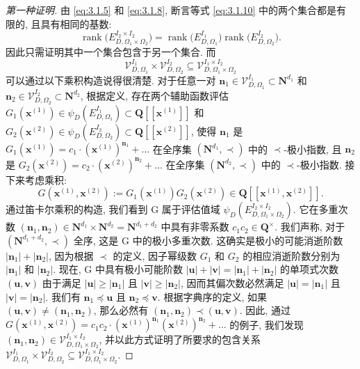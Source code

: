 \begin{proof}[第一种证明]
由 \eqref{eq:3.1.5} 和 \eqref{eq:3.1.8}, 断言等式 \eqref{eq:3.1.10} 中的两个集合都是有限的, 且具有相同的基数:
\[ \operatorname{rank} \big( E_{D,\Omega_1 \times \Omega_2}^{I_2 \times I_2} \big) = \operatorname{rank} \big( E_{D,\Omega_1}^{I_1} \big) \operatorname{rank} \big( E_{D,\Omega_2}^{I_2} \big). \]
因此只需证明其中一个集合包含于另一个集合. 而
\[ \mathcal{V}_{D,\Omega_1}^{I_1} \times \mathcal{V}_{D,\Omega_2}^{I_2} \subseteq \mathcal{V}_{D,\Omega_1 \times \Omega_2}^{I_1 \times I_2} \]
可以通过以下乘积构造说得很清楚. 对于任意一对 \(\mathbf{n}_1 \in \mathcal{V}_{D,\Omega_1}^{I_1} \subset \mathbf{N}^{d_1}\) 和 \(\mathbf{n}_2 \in \mathcal{V}_{D,\Omega_2}^{I_2} \subset \mathbf{N}^{d_2}\), 
根据定义, 存在两个辅助函数评估 \(G_1(\mathbf{x}^{(1)}) \in \psi_D\left(E_{D,\Omega_1}^{I_1}\right) \subset \mathbf{Q}[\![\mathbf{x}^{(1)}]\!]\) 和 \(G_2(\mathbf{x}^{(2)}) \in \psi_D\left(E_{D,\Omega_2}^{I_2}\right) \subset \mathbf{Q}[\![\mathbf{x}^{(2)}]\!]\), 
使得 \(\mathbf{n}_1\) 是 \(G_1(\mathbf{x}^{(1)}) = c_1 \cdot (\mathbf{x}^{(1)})^{\mathbf{n}_1} + \ldots\) 在全序集 \((\mathbf{N}^{d_1}, \prec)\) 中的 \(\prec\)-极小指数, 
且 \(\mathbf{n}_2\) 是 \(G_2(\mathbf{x}^{(2)}) = c_2 \cdot (\mathbf{x}^{(2)})^{\mathbf{n}_2} + \ldots\) 在全序集 \((\mathbf{N}^{d_2}, \prec)\) 中的 \(\prec\)-极小指数. 
接下来考虑乘积:
\[ G(\mathbf{x}^{(1)}, \mathbf{x}^{(2)}) := G_1(\mathbf{x}^{(1)})G_2(\mathbf{x}^{(2)}) \in \mathbf{Q}[\![\mathbf{x}^{(1)}, \mathbf{x}^{(2)}]\!]. \]
通过笛卡尔乘积的构造, 我们看到 G 属于评估值域 \(\psi_D\left(E_{D,\Omega_1\times\Omega_2}^{I_2\times I_2}\right)\). 
它在多重次数 \((\mathbf{n}_1, \mathbf{n}_2) \in \mathbf{N}^{d_1} \times \mathbf{N}^{d_2} = \mathbf{N}^{d_1+d_2}\) 中具有非零系数 \(c_1c_2\in\mathbf{Q}^{\times}\). 
我们声称, 对于 \((\mathbf{N}^{d_1+d_2}, \prec)\) 全序, 这是 G 中的极小多重次数. 
这确实是极小的可能消逝阶数 \(|\mathbf{n}_1| + |\mathbf{n}_2|\), 因为根据 \(\prec\) 的定义, 因子幂级数 \(G_1\) 和 \(G_2\) 的相应消逝阶数分别为 \(|\mathbf{n}_1|\) 和 \(|\mathbf{n}_2|\). 
现在, G 中具有极小可能阶数 \(|\mathbf{u}| + |\mathbf{v}| = |\mathbf{n}_1| + |\mathbf{n}_2|\) 的单项式次数 \((\mathbf{u}, \mathbf{v})\) 由于满足 \(|\mathbf{u}| \geq |\mathbf{n}_1|\) 且 \(|\mathbf{v}| \geq |\mathbf{n}_2|\), 
因而其偏次数必然满足 \(|\mathbf{u}| = |\mathbf{n}_1|\) 且 \(|\mathbf{v}| = |\mathbf{n}_2|\). 
我们有 \(\mathbf{n}_1 \preceq \mathbf{u}\) 且 \(\mathbf{n}_2 \preceq \mathbf{v}\). 根据字典序的定义, 如果 \((\mathbf{u}, \mathbf{v}) \neq (\mathbf{n}_1, \mathbf{n}_2)\), 那么必然有 \((\mathbf{n}_1, \mathbf{n}_2) \prec (\mathbf{u}, \mathbf{v})\). 
因此, 通过 \(G(\mathbf{x}^{(1)}, \mathbf{x}^{(2)}) = c_1 c_2 \cdot (\mathbf{x}^{(1)})^{\mathbf{n}_1} (\mathbf{x}^{(2)})^{\mathbf{n}_2} + \ldots\) 的例子, 
我们发现 \((\mathbf{n}_1, \mathbf{n}_2) \in \mathcal{V}_{D,\Omega_1 \times \Omega_2}^{I_1 \times I_2}\), 
并以此方式证明了所要求的包含关系 \(\mathcal{V}_{D,\Omega_1}^{I_1} \times \mathcal{V}_{D,\Omega_2}^{I_2} \subseteq \mathcal{V}_{D,\Omega_1 \times \Omega_2}^{I_1 \times I_2}\).
\end{proof}

